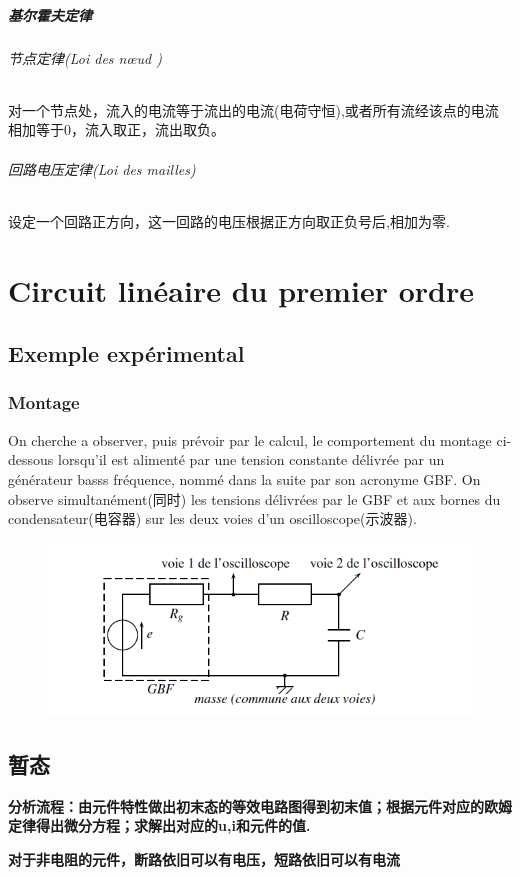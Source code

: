 \documentclass[12pt]{book}
\theoremstyle{definition}\newtheorem{dfn}{Définition}[chapter]
\theoremstyle{plain}\newtheorem{thm}{Théorème}[chapter]
\theoremstyle{plain}\newtheorem{prp}{Proposition}[chapter]
\theoremstyle{plain}\newtheorem{lem}{\bf Lemme}[chapter]
\theoremstyle{plain}\newtheorem{axm}{\bf Axiome}[chapter]
\theoremstyle{plain}\newtheorem{lmm}{\bf Lemme}[chapter]
\theoremstyle{plain}\newtheorem{cor}{\bf Corollaire}[chapter]
\theoremstyle{remark}\newtheorem{rem}{Remarque}[chapter]
\begin{document}
\paragraph{基尔霍夫定律}
\subparagraph{节点定律(Loi des nœud )}对一个节点处，流入的电流等于流出的电流(电荷守恒),或者所有流经该点的电流相加等于0，流入取正，流出取负。
\subparagraph{回路电压定律(Loi des mailles)}设定一个回路正方向，这一回路的电压根据正方向取正负号后,相加为零.

\chapter{Circuit linéaire du premier ordre}
\section{Exemple expérimental}
\subsection{Montage}
On cherche a observer, puis prévoir par le  calcul, le comportement du montage ci-dessous
lorsqu'il est alimenté par une tension constante délivrée par un générateur basss fréquence, nommé dans la suite par son acronyme GBF. On observe simultanément(同时) les tensions délivrées par le GBF et aux bornes du condensateur(电容器) sur les deux voies d'un oscilloscope(示波器).
\begin{figure}[H]
	\centering
	\includegraphics[scale=0.7]{image//Circuit lineaire du premier ordre//1}
\end{figure}

\section{暂态}
\textbf{分析流程：由元件特性做出初末态的等效电路图得到初末值；根据元件对应的欧姆定律得出微分方程；求解出对应的u,i和元件的值.}

\textbf{对于非电阻的元件，断路依旧可以有电压，短路依旧可以有电流}
\end{document}
